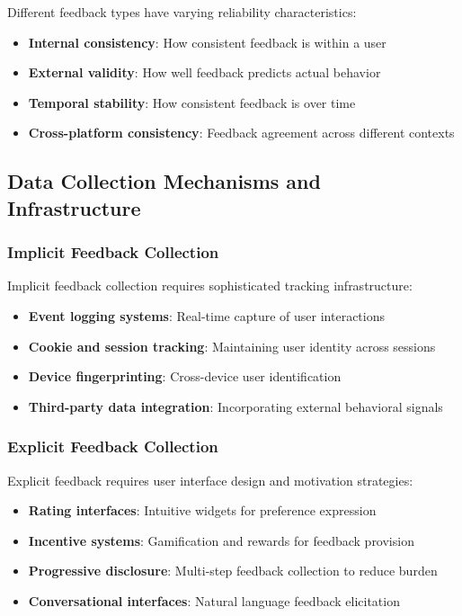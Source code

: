 Different feedback types have varying reliability characteristics:
\begin{itemize}
    \item \textbf{Internal consistency}: How consistent feedback is within a user
    \item \textbf{External validity}: How well feedback predicts actual behavior
    \item \textbf{Temporal stability}: How consistent feedback is over time
    \item \textbf{Cross-platform consistency}: Feedback agreement across different contexts
\end{itemize}

\subsection{Data Collection Mechanisms and Infrastructure}

\subsubsection{Implicit Feedback Collection}

Implicit feedback collection requires sophisticated tracking infrastructure:
\begin{itemize}
    \item \textbf{Event logging systems}: Real-time capture of user interactions
    \item \textbf{Cookie and session tracking}: Maintaining user identity across sessions
    \item \textbf{Device fingerprinting}: Cross-device user identification
    \item \textbf{Third-party data integration}: Incorporating external behavioral signals
\end{itemize}

\subsubsection{Explicit Feedback Collection}

Explicit feedback requires user interface design and motivation strategies:
\begin{itemize}
    \item \textbf{Rating interfaces}: Intuitive widgets for preference expression
    \item \textbf{Incentive systems}: Gamification and rewards for feedback provision
    \item \textbf{Progressive disclosure}: Multi-step feedback collection to reduce burden
    \item \textbf{Conversational interfaces}: Natural language feedback elicitation
\end{itemize}

